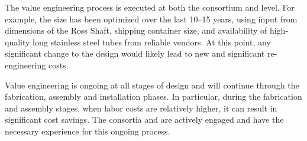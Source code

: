 The value engineering process is executed at both the consortium and
 level. For example, the  size has been optimized
over the last 10--15 years, using input from dimensions of the Ross
Shaft, shipping container size, and availability of high-quality long
stainless steel tubes from reliable vendors.  At this point, any
significant change to the  design would likely lead to new
and significant re-engineering costs.

Value engineering is ongoing at all stages of design and will continue
through the fabrication, assembly and installation phases. In
particular, during the fabrication and assembly stages, when labor costs
are relatively higher, it can result in significant cost savings. The
consortia and  are actively engaged and have the necessary
experience for this ongoing process.
